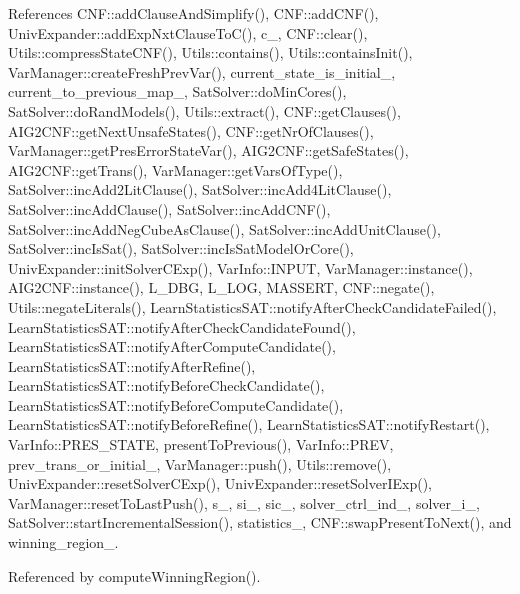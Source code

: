 References C\-N\-F\-::add\-Clause\-And\-Simplify(), C\-N\-F\-::add\-C\-N\-F(), Univ\-Expander\-::add\-Exp\-Nxt\-Clause\-To\-C(), c\-\_\-, C\-N\-F\-::clear(), Utils\-::compress\-State\-C\-N\-F(), Utils\-::contains(), Utils\-::contains\-Init(), Var\-Manager\-::create\-Fresh\-Prev\-Var(), current\-\_\-state\-\_\-is\-\_\-initial\-\_\-, current\-\_\-to\-\_\-previous\-\_\-map\-\_\-, Sat\-Solver\-::do\-Min\-Cores(), Sat\-Solver\-::do\-Rand\-Models(), Utils\-::extract(), C\-N\-F\-::get\-Clauses(), A\-I\-G2\-C\-N\-F\-::get\-Next\-Unsafe\-States(), C\-N\-F\-::get\-Nr\-Of\-Clauses(), Var\-Manager\-::get\-Pres\-Error\-State\-Var(), A\-I\-G2\-C\-N\-F\-::get\-Safe\-States(), A\-I\-G2\-C\-N\-F\-::get\-Trans(), Var\-Manager\-::get\-Vars\-Of\-Type(), Sat\-Solver\-::inc\-Add2\-Lit\-Clause(), Sat\-Solver\-::inc\-Add4\-Lit\-Clause(), Sat\-Solver\-::inc\-Add\-Clause(), Sat\-Solver\-::inc\-Add\-C\-N\-F(), Sat\-Solver\-::inc\-Add\-Neg\-Cube\-As\-Clause(), Sat\-Solver\-::inc\-Add\-Unit\-Clause(), Sat\-Solver\-::inc\-Is\-Sat(), Sat\-Solver\-::inc\-Is\-Sat\-Model\-Or\-Core(), Univ\-Expander\-::init\-Solver\-C\-Exp(), Var\-Info\-::\-I\-N\-P\-U\-T, Var\-Manager\-::instance(), A\-I\-G2\-C\-N\-F\-::instance(), L\-\_\-\-D\-B\-G, L\-\_\-\-L\-O\-G, M\-A\-S\-S\-E\-R\-T, C\-N\-F\-::negate(), Utils\-::negate\-Literals(), Learn\-Statistics\-S\-A\-T\-::notify\-After\-Check\-Candidate\-Failed(), Learn\-Statistics\-S\-A\-T\-::notify\-After\-Check\-Candidate\-Found(), Learn\-Statistics\-S\-A\-T\-::notify\-After\-Compute\-Candidate(), Learn\-Statistics\-S\-A\-T\-::notify\-After\-Refine(), Learn\-Statistics\-S\-A\-T\-::notify\-Before\-Check\-Candidate(), Learn\-Statistics\-S\-A\-T\-::notify\-Before\-Compute\-Candidate(), Learn\-Statistics\-S\-A\-T\-::notify\-Before\-Refine(), Learn\-Statistics\-S\-A\-T\-::notify\-Restart(), Var\-Info\-::\-P\-R\-E\-S\-\_\-\-S\-T\-A\-T\-E, present\-To\-Previous(), Var\-Info\-::\-P\-R\-E\-V, prev\-\_\-trans\-\_\-or\-\_\-initial\-\_\-, Var\-Manager\-::push(), Utils\-::remove(), Univ\-Expander\-::reset\-Solver\-C\-Exp(), Univ\-Expander\-::reset\-Solver\-I\-Exp(), Var\-Manager\-::reset\-To\-Last\-Push(), s\-\_\-, si\-\_\-, sic\-\_\-, solver\-\_\-ctrl\-\_\-ind\-\_\-, solver\-\_\-i\-\_\-, Sat\-Solver\-::start\-Incremental\-Session(), statistics\-\_\-, C\-N\-F\-::swap\-Present\-To\-Next(), and winning\-\_\-region\-\_\-.



Referenced by compute\-Winning\-Region().

